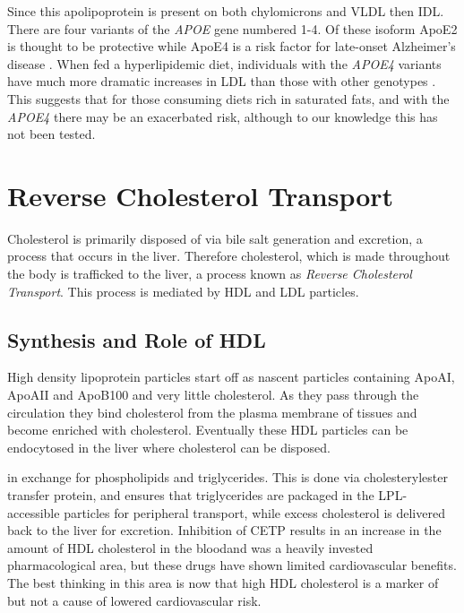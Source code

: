 \documentclass{tufte-handout}
\begin{document}
  Since this apolipoprotein is present on both chylomicrons and VLDL then IDL.  There are four variants of the \textit{APOE} gene numbered 1-4.  Of these isoform ApoE2 is thought to be protective while ApoE4 is a risk factor for late-onset Alzheimer's disease \citep{Poirier1993,Corder1993}.  When fed a hyperlipidemic diet, individuals with the \textit{APOE4} variants have much more dramatic increases in LDL than those with other genotypes \citep{Lehtimaki1992}.  This suggests that for those consuming diets rich in saturated fats, and with the \textit{APOE4} there may be an exacerbated risk, although to our knowledge this has not been tested.

\section{Reverse Cholesterol Transport}

Cholesterol is primarily disposed of via bile salt generation and excretion, a process that occurs in the liver.  Therefore cholesterol, which is made throughout the body is trafficked to the liver, a process known as \emph{Reverse Cholesterol Transport}.  This process is mediated by HDL and LDL particles.

\subsection{Synthesis and Role of HDL}

High density lipoprotein particles start off as nascent particles containing ApoAI, ApoAII and ApoB100 and very little cholesterol.  As they pass through the circulation they bind cholesterol from the plasma membrane of tissues and become enriched with cholesterol.  Eventually these HDL particles can be endocytosed in the liver where cholesterol can be disposed.

 in exchange for phospholipids and triglycerides.  This is done via cholesterylester transfer protein, and ensures that triglycerides are packaged in the LPL-accessible particles for peripheral transport, while excess cholesterol is delivered back to the liver for excretion.   Inhibition of CETP results in an increase in the amount of  HDL cholesterol in the bloodand was a heavily invested pharmacological area, but these drugs have shown limited cardiovascular benefits.  The best thinking in this area is now that high HDL cholesterol is a marker of but not a cause of lowered cardiovascular risk.
\end{document}
